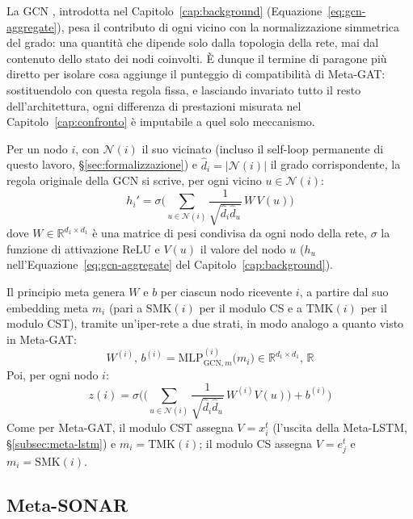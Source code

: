 La GCN \citep{kipf2017gcn}, introdotta nel Capitolo~\ref{cap:background}
(Equazione~\ref{eq:gcn-aggregate}), pesa il contributo di ogni vicino con la
normalizzazione simmetrica del grado: una quantità che dipende solo dalla
topologia della rete, mai dal contenuto dello stato dei nodi coinvolti. È
dunque il termine di paragone più diretto per isolare cosa aggiunge il
punteggio di compatibilità di Meta-GAT: sostituendolo con questa regola
fissa, e lasciando invariato tutto il resto dell'architettura, ogni
differenza di prestazioni misurata nel Capitolo~\ref{cap:confronto} è
imputabile a quel solo meccanismo.

Per un nodo $i$, con $\mathcal{N}(i)$ il suo vicinato (incluso il self-loop
permanente di questo lavoro, §\ref{sec:formalizzazione}) e $\hat d_i =
  |\mathcal{N}(i)|$ il grado corrispondente, la regola originale della GCN si
scrive, per ogni vicino $u \in \mathcal{N}(i)$:
\[
  h_i' = \sigma\Big(\sum_{u \in \mathcal{N}(i)} \frac{1}{\sqrt{\hat d_i \hat d_u}}\, W\, V(u)\Big)
\]
dove $W \in \mathbb{R}^{d_1 \times d_1}$ è una matrice di pesi condivisa da
ogni nodo della rete, $\sigma$ la funzione di attivazione $\mathrm{ReLU}$ e $V(u)$ il valore
del nodo $u$ ($h_u$ nell'Equazione~\ref{eq:gcn-aggregate} del Capitolo~\ref{cap:background}).

Il principio meta genera $W$ e $b$ per ciascun nodo ricevente $i$, a partire
dal suo embedding meta $m_i$ (pari a $\mathrm{SMK}(i)$ per il modulo CS e a
$\mathrm{TMK}(i)$ per il modulo CST), tramite un'iper-rete a due strati,
in modo analogo a quanto visto in Meta-GAT:
\[
  W^{(i)}, \, b^{(i)} = \mathrm{MLP}_{\mathrm{GCN},m}^{(i)}\big(m_i\big) \in \mathbb{R}^{d_1 \times d_1}, \, \mathbb{R}
\]
Poi, per ogni nodo $i$:
\begin{equation}
  z(i) = \sigma\Bigg(\bigg(\sum_{u \in \mathcal{N}(i)} \frac{1}{\sqrt{\hat d_i \hat d_u}}\, W^{(i)}V(u)\bigg) + b^{(i)}\Bigg)
  \label{eq:metagcn}
\end{equation}
Come per Meta-GAT, il modulo CST assegna $V=x_i^t$ (l'uscita della
Meta-LSTM, §\ref{subsec:meta-lstm}) e $m_i=\mathrm{TMK}(i)$; il modulo CS
assegna $V=e_j^t$ e $m_i=\mathrm{SMK}(i)$.

\subsection{Meta-SONAR}
\label{subsec:meta-sonar}

